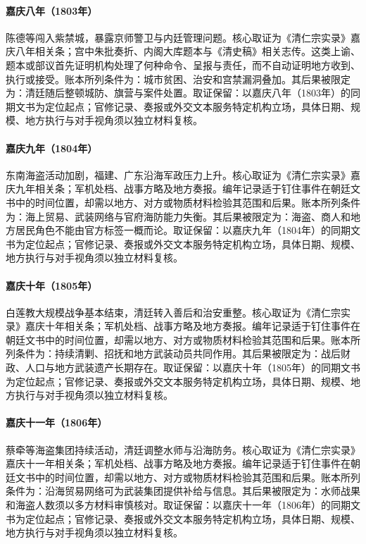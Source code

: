 \hypertarget{ledger:EQ-1803-FORBIDDEN-CITY-ATTACK}{}\paragraph{嘉庆八年（1803年）}陈德等闯入紫禁城，暴露京师警卫与内廷管理问题。核心取证为《清仁宗实录》嘉庆八年相关条；宫中朱批奏折、内阁大库题本与《清史稿》相关志传。这类上谕、题本或部议首先证明机构处理了何种命令、呈报与责任，而不自动证明地方收到、执行或接受。账本所列条件为：城市贫困、治安和宫禁漏洞叠加。其后果被限定为：清廷随后整顿城防、旗营与案件处置。取证保留：以嘉庆八年（1803年）的同期文书为定位起点；官修记录、奏报或外交文本服务特定机构立场，具体日期、规模、地方执行与对手视角须以独立材料复核。
\hypertarget{ledger:EQ-1804-COASTAL-PIRACY}{}\paragraph{嘉庆九年（1804年）}东南海盗活动加剧，福建、广东沿海军政压力上升。核心取证为《清仁宗实录》嘉庆九年相关条；军机处档、战事方略及地方奏报。编年记录适于钉住事件在朝廷文书中的时间位置，却需以地方、对方或物质材料检验其范围和后果。账本所列条件为：海上贸易、武装网络与官府海防能力失衡。其后果被限定为：海盗、商人和地方居民角色不能由官方标签一概而论。取证保留：以嘉庆九年（1804年）的同期文书为定位起点；官修记录、奏报或外交文本服务特定机构立场，具体日期、规模、地方执行与对手视角须以独立材料复核。
\hypertarget{ledger:EQ-1805-WHITE-LOTUS-WAR-END}{}\paragraph{嘉庆十年（1805年）}白莲教大规模战争基本结束，清廷转入善后和治安重整。核心取证为《清仁宗实录》嘉庆十年相关条；军机处档、战事方略及地方奏报。编年记录适于钉住事件在朝廷文书中的时间位置，却需以地方、对方或物质材料检验其范围和后果。账本所列条件为：持续清剿、招抚和地方武装动员共同作用。其后果被限定为：战后财政、人口与地方武装遗产长期存在。取证保留：以嘉庆十年（1805年）的同期文书为定位起点；官修记录、奏报或外交文本服务特定机构立场，具体日期、规模、地方执行与对手视角须以独立材料复核。
\hypertarget{ledger:EQ-1806-TSAI-QIAN-PIRACY}{}\paragraph{嘉庆十一年（1806年）}蔡牵等海盗集团持续活动，清廷调整水师与沿海防务。核心取证为《清仁宗实录》嘉庆十一年相关条；军机处档、战事方略及地方奏报。编年记录适于钉住事件在朝廷文书中的时间位置，却需以地方、对方或物质材料检验其范围和后果。账本所列条件为：沿海贸易网络可为武装集团提供补给与信息。其后果被限定为：水师战果和海盗人数须以多方材料审慎核对。取证保留：以嘉庆十一年（1806年）的同期文书为定位起点；官修记录、奏报或外交文本服务特定机构立场，具体日期、规模、地方执行与对手视角须以独立材料复核。
